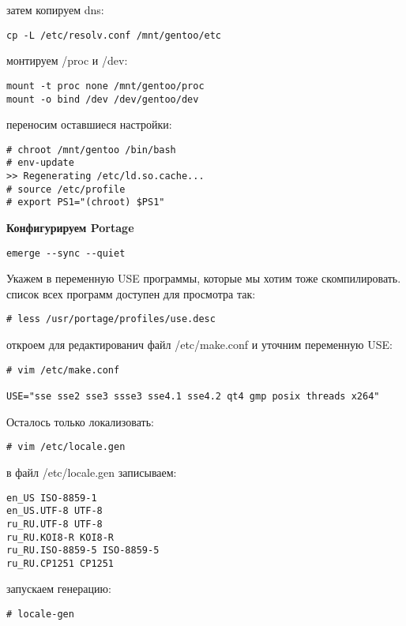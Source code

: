 \documentclass[12pt, a4paper]{article}
\begin{document}
затем копируем dns:

\begin{verbatim}
cp -L /etc/resolv.conf /mnt/gentoo/etc
\end{verbatim}

монтируем /proc и /dev:

\begin{verbatim}
mount -t proc none /mnt/gentoo/proc
mount -o bind /dev /dev/gentoo/dev
\end{verbatim}

переносим оставшиеся настройки:

\begin{verbatim}
# chroot /mnt/gentoo /bin/bash
# env-update
>> Regenerating /etc/ld.so.cache...
# source /etc/profile
# export PS1="(chroot) $PS1"
\end{verbatim}

{\bf Конфигурируем Portage}

\begin{verbatim}
emerge --sync --quiet
\end{verbatim}

Укажем в переменную USE программы, которые мы хотим тоже скомпилировать. список всех программ доступен для просмотра так:

\begin{verbatim}
# less /usr/portage/profiles/use.desc
\end{verbatim}

откроем для редактированич файл /etc/make.conf и уточним переменную USE:

\begin{verbatim}
# vim /etc/make.conf

USE="sse sse2 sse3 ssse3 sse4.1 sse4.2 qt4 gmp posix threads x264"
\end{verbatim}

Осталось только локализовать:

\begin{verbatim}
# vim /etc/locale.gen
\end{verbatim}

в файл /etc/locale.gen записываем:

\begin{verbatim}
en_US ISO-8859-1
en_US.UTF-8 UTF-8
ru_RU.UTF-8 UTF-8
ru_RU.KOI8-R KOI8-R
ru_RU.ISO-8859-5 ISO-8859-5
ru_RU.CP1251 CP1251
\end{verbatim}

запускаем генерацию:

\begin{verbatim}
# locale-gen
\end{verbatim}
\end{document}
